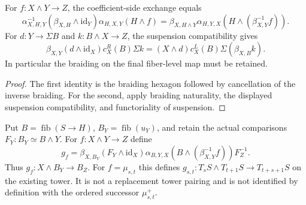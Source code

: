 \begin{proposition}
  \label{prop:h6-braided-boundary-transport}
  \leanok
  For $f:X\wedge Y\to Z$, the coefficient-side exchange equals
  \[
    \alpha_{X,H,Y}^{-1}(\beta_{X,H}\wedge\mathrm{id}_Y)
       \alpha_{H,X,Y}(H\wedge f)
      =\beta_{X,H\wedge Y}\alpha_{H,Y,X}
         (H\wedge(\beta_{X,Y}^{-1}f)).
  \]
  For $d:Y\to\Sigma B$ and $k:B\wedge X\to Z$, the suspension
  compatibility gives
  \[
    \beta_{X,Y}(d\wedge\mathrm{id}_X)c_X^R(B)\Sigma k
       =(X\wedge d)c_X^L(B)\Sigma(\beta_{X,B}k).
  \]
  In particular the braiding on the final fiber-level map must be retained.
\end{proposition}
\begin{proof}
  The first identity is the braiding hexagon followed by cancellation of
  the inverse braiding. For the second, apply braiding naturality, the
  displayed suspension compatibility, and functoriality of suspension.
  \leanok
\end{proof}

\begin{definition}
  \label{def:h6-braided-right-fiber-lift}
  \leanok
  Put $B=\operatorname{fib}(S\to H)$, $B_Y=\operatorname{fib}(u_Y)$,
  and retain the actual comparisons $F_Y:B_Y\simeq B\wedge Y$.
  For $f:X\wedge Y\to Z$ define
  \[
    g_f=\beta_{X,B_Y}(F_Y\wedge\mathrm{id}_X)\alpha_{B,Y,X}
        (B\wedge(\beta_{X,Y}^{-1}f))F_Z^{-1}.
  \]
  Thus $g_f:X\wedge B_Y\to B_Z$. For $f=\mu_{s,t}$ this defines
  $g_{s,t}:T_sS\wedge T_{t+1}S\to T_{t+s+1}S$ on the existing tower.
  It is not a replacement tower pairing and is not identified by definition
  with the ordered successor $\mu^+_{s,t}$.
\end{definition}

